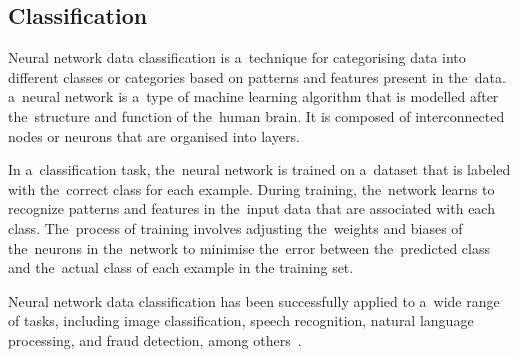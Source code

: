     \subsection{Classification} \label{subsec:clasification}
    Neural network data classification is a~technique for categorising data into different classes or categories based on patterns and features present in the~data. a~neural network is a~type of machine learning algorithm that is modelled after the~structure and function of the~human brain. It is composed of interconnected nodes or neurons that are organised into layers.
    
    In a~classification task, the~neural network is trained on a~dataset that is labeled with the~correct
class for each example. During training, the~network learns to recognize patterns and features in the~input data
that are associated with each class. The~process of training involves adjusting the~weights and biases of the~neurons in the~network to minimise the~error between the~predicted class and the~actual class of each example in the training set.

    Neural network data classification has been successfully applied to a~wide range of tasks, including image
classification, speech recognition, natural language processing, and fraud detection, among others~\cite{feraud2002methodology}.

